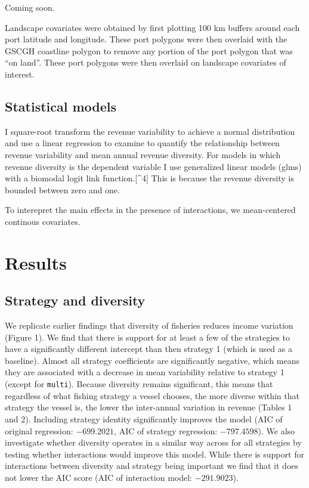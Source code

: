 \documentclass[]{article}
\begin{document}
Coming soon.

Landscape covariates were obtained by first plotting 100 km buffers
around each port latitude and longitude. These port polygons were then
overlaid with the GSCGH coastline polygon to remove any portion of the
port polygon that was ``on land''. These port polygons were then
overlaid on landscape covariates of interest.

\subsection{Statistical models}\label{statistical-models}

I square-root transform the revenue variability to achieve a normal
distribution and use a linear regression to examine to quantify the
relationship between revenue variability and mean annual revenue
diversity. For models in which revenue diversity is the dependent
variable I use generalized linear models (glms) with a biomodal logit
link function.{[}\^{}4{]} This is because the revenue diversity is
bounded between zero and one.

To interepret the main effects in the presence of interactions, we
mean-centered continous covariates.

\section{Results}\label{results}

\subsection{Strategy and diversity}\label{strategy-and-diversity}

We replicate earlier findings that diversity of fisheries reduces income
variation (Figure 1). We find that there is support for at least a few
of the strategies to have a significantly different intercept than then
strategy 1 (which is used as a baseline). Almost all strategy
coefficients are significantly negative, which means they are associated
with a decrease in mean variability relative to strategy 1 (except for
\texttt{multi}). Because diversity remains significant, this means that
regardless of what fishing strategy a vessel chooses, the more diverse
within that strategy the vessel is, the lower the inter-annual variation
in revenue (Tables 1 and 2). Including strategy identity significantly
improves the model (AIC of original regression: \(-699.2021\), AIC of
strategy regression: \(-797.4598\)). We also investigate whether
diversity operates in a similar way across for all strategies by testing
whether interactions would improve this model. While there is support
for interactions between diversity and strategy being important we find
that it does not lower the AIC score (AIC of interaction model:
\(-291.9023\)).
\end{document}
